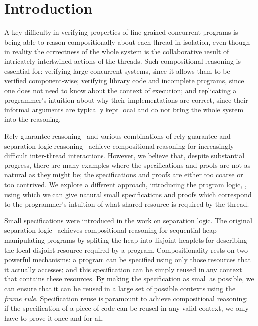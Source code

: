 \section{Introduction}
\label{sec:introduction}



A key difficulty in verifying properties of fine-grained concurrent
programs is being able to reason compositionally about each thread in
isolation, even though in reality the correctness of the whole system
is the collaborative result of intricately intertwined actions of the
threads.  Such compositional reasoning is essential for: verifying
large concurrent systems, since it allows them to be verified
component-wise;  verifying library code and incomplete programs,
since one does not need to know about the context of execution; and 
replicating a programmer's intuition about why their implementations
are correct, since their informal arguments are typically  kept local and do
not bring the whole system into the reasoning.


Rely-guarantee reasoning~\cite{rg} and various combinations of
rely-guarantee and separation-logic
reasoning~\cite{viktor-marriage,dg,lrg,cap-ecoop10,icap,tada} achieve
compositional reasoning for increasingly difficult inter-thread
interactions. However, we believe that, despite substantial progress, there are many
examples where the specifications and proofs are not as natural as
they might be; the specifications and proofs are either too coarse or
too 
contrived. 
We explore a different approach, introducing the
program logic, \colosl, using which we can give natural small
specifications and proofs which correspond to the  programmer's intuition of what shared
resource
is required by the thread. 




Small specifications were introduced in the work on separation logic. 
The original separation logic~\cite{rey02,seplog} achieves
compositional reasoning for sequential heap-manipulating programs by
spliting the heap into disjoint heaplets for describing the local
disjoint resource required by a program. Compositionality rests on two
powerful mechanisms: a program  can be specified using only those
resources that it actually accesses; and this specification can be
simply reused in any context that contains these resources.
By making the specification
as small  as possible, we can ensure that it
can be reused in a large set of possible contexts using  the {\em frame
rule}. 
 Specification reuse is paramount to achieve compositional
reasoning: if the specification of a piece of code can be reused in
any valid context, we only have  to prove it once and for all. 


